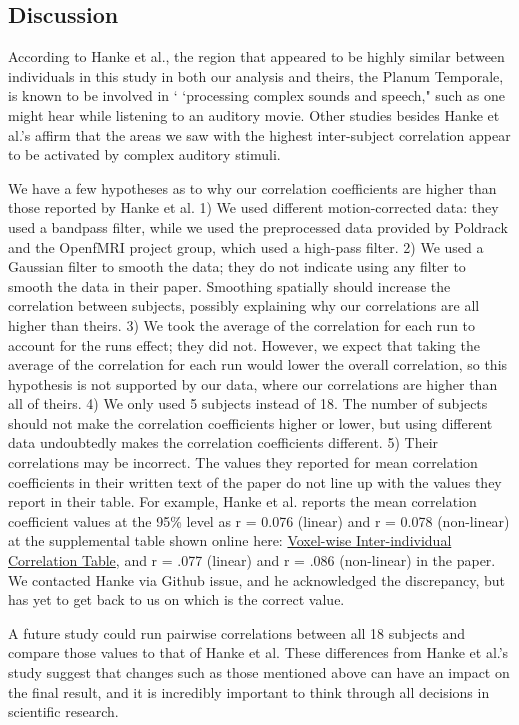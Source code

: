 \documentclass[11pt]{article}
\begin{document}
\subsection{Discussion}
According to Hanke et al., the region that appeared to be highly similar 
between individuals in this study in both our analysis and theirs, the Planum Temporale, is known to be involved in 
` `processing complex sounds and speech,"\cite{hank2014audiomovie} such as one 
might hear while listening to an auditory movie.  Other studies besides 
Hanke et al.'s affirm that the areas we saw with the highest inter-subject
correlation appear to be activated by complex auditory stimuli\cite{chevillet2011functional}.

We have a few hypotheses as to why our correlation coefficients are 
higher than those reported by Hanke et al.  1) We used 
different motion-corrected data: they used a bandpass filter, while we 
used the preprocessed data provided by Poldrack and the OpenfMRI project group, which used a high-pass
filter.  2) We used a Gaussian filter to smooth the data; they do not 
indicate using any filter to smooth the data in their paper.  Smoothing 
spatially should increase the correlation between subjects, possibly 
explaining why our correlations are all higher than theirs.  3) We 
took the average of the correlation for each run to account for the runs
effect; they did not.  However, we expect that taking the average of 
the correlation for each run would lower the overall correlation, so
this hypothesis is not supported by our data, where our correlations
are higher than all of theirs.   4) We only used 5 subjects instead of
18.  The number of subjects should not make the correlation coefficients
higher or lower, but using different data undoubtedly makes the
correlation coefficients different.  5) Their correlations may be incorrect.
The values they reported for mean correlation coefficients in their 
written text of the paper do not line up with the values they report in 
their table.  For example, Hanke et al. reports the mean correlation 
coefficient values at the 95\% level as r = 0.076 (linear) and r = 0.078 
(non-linear) at the supplemental table shown online here: \href{http://www.nature.com/articles/sdata20143/tables/5}{Voxel-wise Inter-individual Correlation Table}, and r = .077 (linear) 
and r = .086 (non-linear) in the paper.  We contacted Hanke via Github issue, and he acknowledged 
the discrepancy, but has yet to get back to us on which is the correct value.  

A future study could run pairwise correlations between all 18 subjects and compare 
those values to that of Hanke et al.  These differences from Hanke et al.'s study suggest that changes such as those mentioned above can have an impact on the final
result, and it is incredibly important to think through all decisions in scientific
research.  
\end{document}
